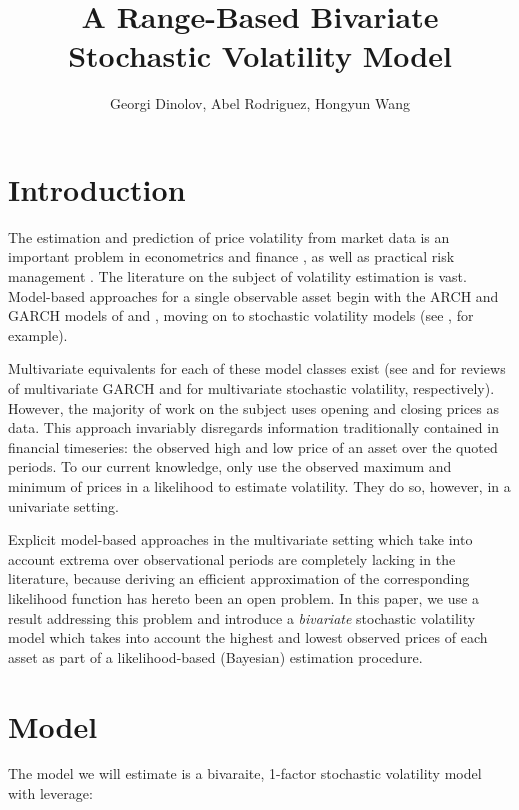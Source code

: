 \documentclass[10pt]{article}
\title{A Range-Based Bivariate Stochastic Volatility Model}
\author{Georgi Dinolov, Abel Rodriguez, Hongyun Wang}
\date{} %
\begin{document}
\def\spacingset#1{\renewcommand{\baselinestretch}%
{#1}\small\normalsize} \spacingset{1}

\bigskip

\vspace{1cm}
\noindent

\spacingset{1.00} %
\section{Introduction}

The estimation and prediction of price volatility from market data is
an important problem in econometrics and finance
\citep{abramov2007estimation}, as well as practical risk management
\citep{brandt2006dynamic}. The literature on the subject of volatility
estimation is vast. Model-based approaches for a single observable
asset begin with the ARCH and GARCH models of \cite{engle1982} and
\cite{bollerslev1986}, moving on to stochastic volatility models (see
\cite{shephard2005selected-readings}, for example).

Multivariate equivalents for each of these model classes exist (see
\cite{bauwens2006multivariate} and \cite{asai2006multivariate} for
reviews of multivariate GARCH and for multivariate stochastic
volatility, respectively). However, the majority of work on the
subject uses opening and closing prices as data. This approach
invariably disregards information traditionally contained in financial
timeseries: the observed high and low price of an asset over the
quoted periods. To our current knowledge, only \cite{rodriguez2012}
use the observed maximum and minimum of prices in a likelihood to
estimate volatility. They do so, however, in a univariate
setting.

Explicit model-based approaches in the multivariate setting which take
into account extrema over observational periods are completely lacking
in the literature, because deriving an efficient approximation of the
corresponding likelihood function has hereto been an open problem. In
this paper, we use a result addressing this problem and introduce a
\textit{bivariate} stochastic volatility model which takes into
account the highest and lowest observed prices of each asset as part
of a likelihood-based (Bayesian) estimation procedure.

\section{Model}
The model we will estimate is a bivaraite, 1-factor stochastic volatility
model with leverage:
\end{document}
